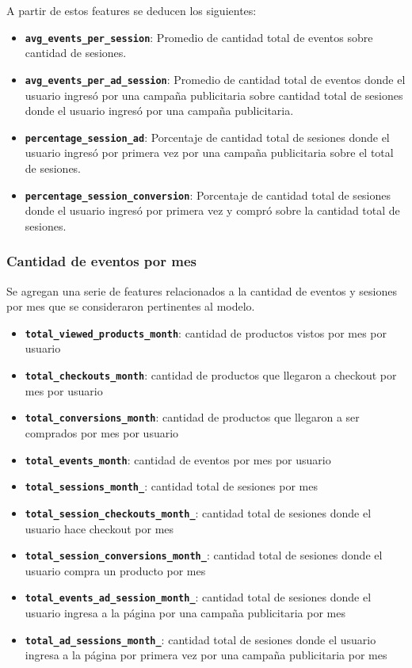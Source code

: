 \documentclass[a4paper]{article}
\begin{document}
A partir de estos features se deducen los siguientes:

\begin{itemize}
	\item \textbf{\texttt{avg\_events\_per\_session}}: Promedio de cantidad total de eventos sobre cantidad de sesiones.
	\item \textbf{\texttt{avg\_events\_per\_ad\_session}}: Promedio de cantidad total de eventos donde el usuario ingresó por una campaña publicitaria sobre cantidad total de sesiones donde el usuario ingresó por una campaña publicitaria.
	\item \textbf{\texttt{percentage\_session\_ad}}: Porcentaje de cantidad total de sesiones donde el usuario ingresó por primera vez por una campaña publicitaria sobre el total de sesiones.
	\item \textbf{\texttt{percentage\_session\_conversion}}: Porcentaje de cantidad total de sesiones donde el usuario ingresó por primera vez y compró sobre la cantidad total de sesiones.
\end{itemize}

\subsubsection{Cantidad de eventos por mes}

Se agregan una serie de features relacionados a la cantidad de eventos y sesiones por mes que se consideraron pertinentes al modelo.

\begin{itemize}
	\item \textbf{\texttt{total\_viewed\_products\_month}}: cantidad de productos vistos por mes por usuario
	\item \textbf{\texttt{total\_checkouts\_month}}: cantidad de productos que llegaron a checkout por mes por usuario
	\item \textbf{\texttt{total\_conversions\_month}}: cantidad de productos que llegaron a ser comprados por mes por usuario
	\item \textbf{\texttt{total\_events\_month}}: cantidad de eventos por mes por usuario
	\item \textbf{\texttt{total\_sessions\_month\_}}: cantidad total de sesiones por mes
	\item \textbf{\texttt{total\_session\_checkouts\_month\_}}: cantidad total de sesiones donde el usuario hace checkout por mes
	\item \textbf{\texttt{total\_session\_conversions\_month\_}}: cantidad total de sesiones donde el usuario compra un producto por mes
	\item \textbf{\texttt{total\_events\_ad\_session\_month\_}}: cantidad total de sesiones donde el usuario ingresa a la página por una campaña publicitaria por mes
	\item \textbf{\texttt{total\_ad\_sessions\_month\_}}: cantidad total de sesiones donde el usuario ingresa a la página por primera vez por una campaña publicitaria por mes
	 
\end{itemize}
\end{document}
